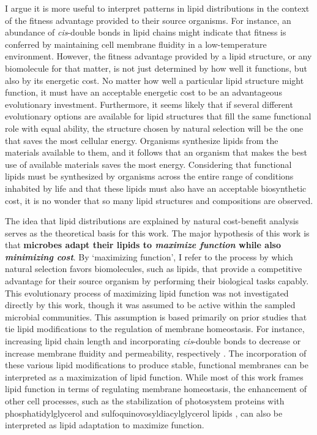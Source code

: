 I argue it is more useful to interpret patterns in lipid distributions in the context of the fitness advantage provided to their source organisms. For instance, an abundance of \textit{cis}-double bonds in lipid chains might indicate that fitness is conferred by maintaining cell membrane fluidity in a low-temperature environment. However, the fitness advantage provided by a lipid structure, or any biomolecule for that matter, is not just determined by how well it functions, but also by its energetic cost. No matter how well a particular lipid structure might function, it must have an acceptable energetic cost to be an advantageous evolutionary investment. Furthermore, it seems likely that if several different evolutionary options are available for lipid structures that fill the same functional role with equal ability, the structure chosen by natural selection will be the one that saves the most cellular energy. Organisms synthesize lipids from the materials available to them, and it follows that an organism that makes the best use of available materials saves the most energy. Considering that functional lipids must be synthesized by organisms across the entire range of conditions inhabited by life and that these lipids must also have an acceptable biosynthetic cost, it is no wonder that so many lipid structures and compositions are observed. 

The idea that lipid distributions are explained by natural cost-benefit analysis serves as the theoretical basis for this work. The major hypothesis of this work is that \textbf{microbes adapt their lipids to \textit{maximize function} while also \textit{minimizing cost}}. By `maximizing function', I refer to the process by which natural selection favors biomolecules, such as lipids, that provide a competitive advantage for their source organism by performing their biological tasks capably. This evolutionary process of maximizing lipid function was not investigated directly by this work, though it was assumed to be active within the sampled microbial communities. This assumption is based primarily on prior studies that tie lipid modifications to the regulation of membrane homeostasis. For instance, increasing lipid chain length and incorporating \textit{cis}-double bonds to decrease or increase membrane fluidity and permeability, respectively \citep[see review by][]{zhang2008membrane}. The incorporation of these various lipid modifications to produce stable, functional membranes can be interpreted as a maximization of lipid function. While most of this work frames lipid function in terms of regulating membrane homeostasis, the enhancement of other cell processes, such as the stabilization of photosystem proteins with phosphatidylglycerol and sulfoquinovosyldiacylglycerol lipids \citep{sato2004roles}, can also be interpreted as lipid adaptation to maximize function.

